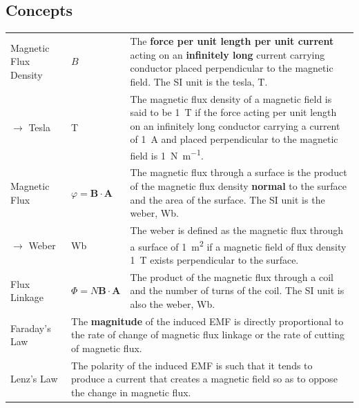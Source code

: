 \documentclass[a4paper,11pt]{article}
\begin{document}
	\subsection{Concepts}
	\begin{center}
		\renewcommand{\arraystretch}{1.4}
		\begin{tabular}{@{} l l p{8.6cm} @{}}
			\toprule
			Magnetic Flux Density & $B$ & The \textbf{force per unit length per unit current} acting on an \textbf{infinitely long} current carrying conductor placed perpendicular to the magnetic field. The SI unit is the tesla, \si{\tesla}. \\
			$\rightarrow$ Tesla & \si{\tesla} & The magnetic flux density of a magnetic field is said to be \SI{1}{\tesla} if the force acting per unit length on an infinitely long conductor carrying a current of \SI{1}{\ampere} and placed perpendicular to the magnetic field is \SI{1}{\newton\per\meter}. \\
			Magnetic Flux & $\varphi=\textbf{B}\cdot\textbf{A}$ & The magnetic flux through a surface is the product of the magnetic flux density \textbf{normal} to the surface and the area of the surface. The SI unit is the weber, \si{\weber}. \\
			$\rightarrow$ Weber & \si{\weber} & The weber is defined as the magnetic flux through a surface of \SI{1}{\meter\squared} if a magnetic field of flux density \SI{1}{\tesla} exists perpendicular to the surface.\\
			Flux Linkage & $\Phi=N\textbf{B}\cdot\textbf{A}$ & The product of the magnetic flux through a coil and the number of turns of the coil. The SI unit is also the weber, \si{\weber}. \\
			\midrule
			Faraday's Law & \multicolumn{2}{p{11.1cm}}{The \textbf{magnitude} of the induced EMF is directly proportional to the rate of change of magnetic flux linkage or the rate of cutting of magnetic flux.}\\
			Lenz's Law & \multicolumn{2}{p{11.1cm}}{The polarity of the induced EMF is such that it tends to produce a current that creates a magnetic field so as to oppose the change in magnetic flux. } \\
			\bottomrule
		\end{tabular}
	\end{center}
\end{document}
